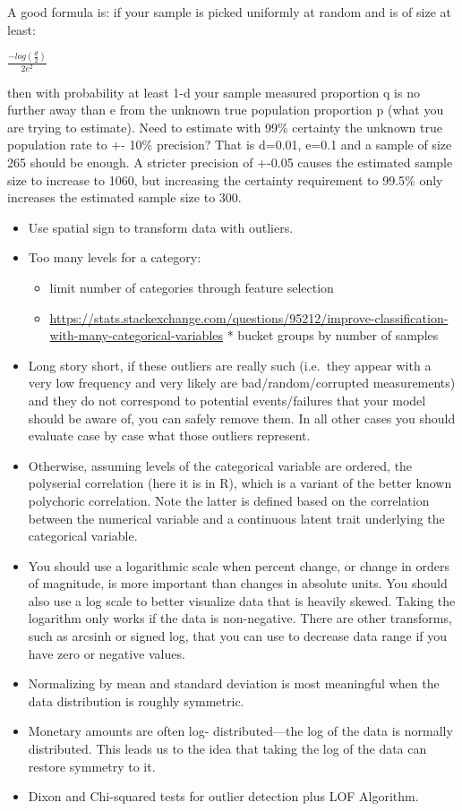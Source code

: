 \documentclass[]{book}
\providecommand{\tightlist}{%
  \setlength{\itemsep}{0pt}\setlength{\parskip}{0pt}}
\begin{document}
A good formula is: if your sample is picked uniformly at random and is of size at least:

\(\frac{-log(\frac{d}{2})}{2e^2}\)

then with probability at least 1-d your sample measured proportion q is no further away than e from the unknown true population proportion p (what you are trying to estimate). Need to estimate with 99\% certainty the unknown true population rate to +- 10\% precision? That is d=0.01, e=0.1 and a sample of size 265 should be enough. A stricter precision of +-0.05 causes the estimated sample size to increase to 1060, but increasing the certainty requirement to 99.5\% only increases the estimated sample size to 300.

\begin{itemize}
\item
  Use spatial sign to transform data with outliers.
\item
  Too many levels for a category:

  \begin{itemize}
  \tightlist
  \item
    limit number of categories through feature selection
  \item
    \url{https://stats.stackexchange.com/questions/95212/improve-classification-with-many-categorical-variables} * bucket groups by number of samples
  \end{itemize}
\item
  Long story short, if these outliers are really such (i.e.~they appear with a very low frequency and very likely are bad/random/corrupted measurements) and they do not correspond to potential events/failures that your model should be aware of, you can safely remove them. In all other cases you should evaluate case by case what those outliers represent.
\item
  Otherwise, assuming levels of the categorical variable are ordered, the polyserial correlation (here it is in R), which is a variant of the better known polychoric correlation. Note the latter is defined based on the correlation between the numerical variable and a continuous latent trait underlying the categorical variable.
\item
  You should use a logarithmic scale when percent change, or change in orders of magnitude, is more important than changes in absolute units. You should also use a log scale to better visualize data that is heavily skewed. Taking the logarithm only works if the data is non-negative. There are other transforms, such as arcsinh or signed log, that you can use to decrease data range if you have zero or negative values.
\item
  Normalizing by mean and standard deviation is most meaningful when the data distribution is roughly symmetric.
\item
  Monetary amounts are often log- distributed---the log of the data is normally distributed. This leads us to the idea that taking the log of the data can restore symmetry to it.
\item
  Dixon and Chi-squared tests for outlier detection plus LOF Algorithm.
\end{itemize}
\end{document}
